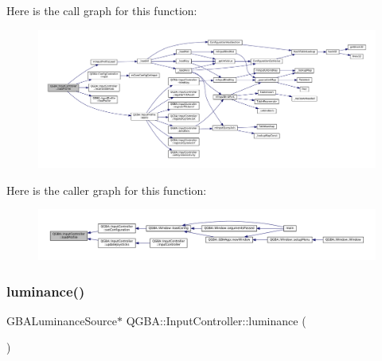 Here is the call graph for this function\+:
\nopagebreak
\begin{figure}[H]
\begin{center}
\leavevmode
\includegraphics[width=350pt]{class_q_g_b_a_1_1_input_controller_a711e7514a7fb09f023cb388b19fc8fd5_cgraph}
\end{center}
\end{figure}
Here is the caller graph for this function\+:
\nopagebreak
\begin{figure}[H]
\begin{center}
\leavevmode
\includegraphics[width=350pt]{class_q_g_b_a_1_1_input_controller_a711e7514a7fb09f023cb388b19fc8fd5_icgraph}
\end{center}
\end{figure}
\mbox{\label{class_q_g_b_a_1_1_input_controller_a0d11486244b97b4581f651b212bcdbc5}} 
\subsubsection{\texorpdfstring{luminance()}{luminance()}}
{\footnotesize\ttfamily G\+B\+A\+Luminance\+Source$\ast$ Q\+G\+B\+A\+::\+Input\+Controller\+::luminance (\begin{DoxyParamCaption}{ }\end{DoxyParamCaption})\hspace{0.3cm}{\ttfamily [inline]}}

